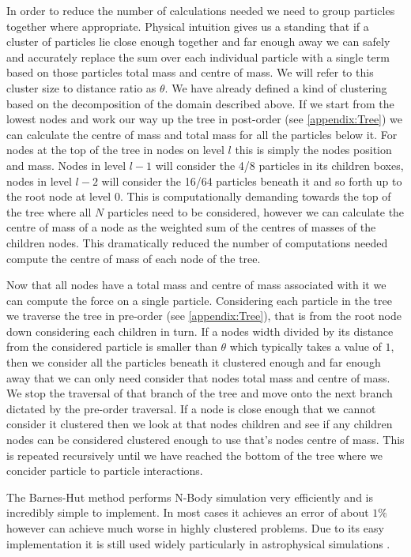 In order to reduce the number of calculations needed we need to group particles together where appropriate. Physical intuition gives us a standing that if a cluster of particles lie close enough together and far enough away we can safely and accurately replace the sum over each individual particle with a single term based on those particles total mass and centre of mass. We will refer to this cluster size to distance ratio as $\theta$. We have already defined a kind of clustering based on the decomposition of the domain described above. If we start from the lowest nodes and work our way up the tree in post-order (see \cref{appendix:Tree}) we can calculate the centre of mass and total mass for all the particles below it. For nodes at the top of the tree in nodes on level $l$ this is simply the nodes position and mass. Nodes in level $l-1$ will consider the 4/8 particles in its children boxes, nodes in level $l-2$ will consider the 16/64 particles beneath it and so forth up to the root node at level $0$. This is computationally demanding towards the top of the tree where all $N$ particles need to be considered, however we can calculate the centre of mass of a node as the weighted sum of the centres of masses of the children nodes. This dramatically reduced the number of computations needed compute the centre of mass of each node of the tree. 

Now that all nodes have a total mass and centre of mass associated with it we can compute the force on a single particle. Considering each particle in the tree we traverse the tree in pre-order (see \cref{appendix:Tree}), that is from the root node down considering each children in turn. If a nodes width divided by its distance from the considered particle is smaller than $\theta$ which typically takes a value of $1$, then we consider all the particles beneath it clustered enough and far enough away that we can only need consider that nodes total mass and centre of mass. We stop the traversal of that branch of the tree and move onto the next branch dictated by the pre-order traversal. If a node is close enough that we cannot consider it clustered then we look at that nodes children and see if any children nodes can be considered clustered enough to use that's nodes centre of mass. This is repeated recursively until we have reached the bottom of the tree where we concider particle to particle interactions.

The Barnes-Hut method performs N-Body simulation very efficiently and is incredibly simple to implement. In most cases it achieves an error of about $1\%$ however can achieve much worse in highly clustered problems. Due to its easy implementation it is still used widely particularly in astrophysical simulations \cite{Gaburov2010,Capuzzo-DolcettaIstitutoAstronomico,Ishiyama20124.45Problem,Iwasawa2019ImplementationC,Rein2013Large-scaleRings}.

